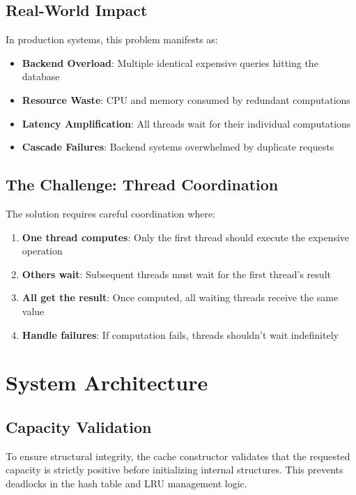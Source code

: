 \documentclass[11pt,a4paper]{article}
\begin{document}
\subsection{Real-World Impact}

In production systems, this problem manifests as:

\begin{itemize}
\item \textbf{Backend Overload}: Multiple identical expensive queries
      hitting the database
\item \textbf{Resource Waste}: CPU and memory consumed by redundant
      computations
\item \textbf{Latency Amplification}: All threads wait for their
      individual computations
\item \textbf{Cascade Failures}: Backend systems overwhelmed by
      duplicate requests
\end{itemize}

\subsection{The Challenge: Thread Coordination}

The solution requires careful coordination where:

\begin{enumerate}
\item \textbf{One thread computes}: Only the first thread should execute
      the expensive operation
\item \textbf{Others wait}: Subsequent threads must wait for the first
      thread's result
\item \textbf{All get the result}: Once computed, all waiting threads
      receive the same value
\item \textbf{Handle failures}: If computation fails, threads shouldn't
      wait indefinitely
\end{enumerate}

\section{System Architecture}

\subsection{Capacity Validation}

To ensure structural integrity, the cache constructor validates that the
requested capacity is strictly positive before initializing internal
structures. This prevents deadlocks in the hash table and LRU management
logic.
\end{document}

